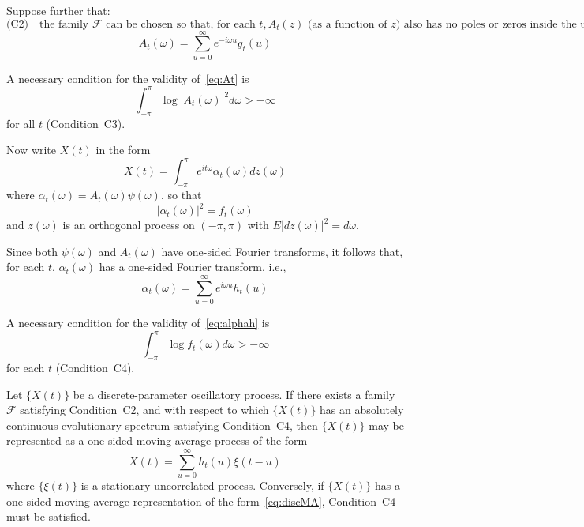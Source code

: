 \documentclass[11pt]{article}
\begin{document}
Suppose further that:
\begin{equation}
\text{(C2)} \quad \text{the family } \mathscr{F} \text{ can be chosen so that, for each } t, A_t(z) \text{ (as a function of } z) \text{ also has no poles or zeros inside the unit circle, so that, for each } t, 
\end{equation}
\begin{equation}
A_t(\omega) = \sum_{u=0}^{\infty} e^{-i\omega u} g_t(u)
\label{eq:At}
\end{equation}

A necessary condition for the validity of~\eqref{eq:At} is
\begin{equation}
\int_{-\pi}^{\pi} \log |A_t(\omega)|^2 d\omega > -\infty
\label{eq:C3}
\end{equation}
for all $t$ (Condition~C3).

Now write $X(t)$ in the form
\begin{equation}
X(t) = \int_{-\pi}^{\pi} e^{it\omega} \alpha_t(\omega) dz(\omega)
\label{eq:Xtalpha}
\end{equation}
where $\alpha_t(\omega) = A_t(\omega)\psi(\omega)$, so that
\begin{equation}
|\alpha_t(\omega)|^2 = f_t(\omega)
\label{eq:alphaft}
\end{equation}
and $z(\omega)$ is an orthogonal process on $(-\pi, \pi)$ with $E|dz(\omega)|^2 = d\omega$.

Since both $\psi(\omega)$ and $A_t(\omega)$ have one-sided Fourier transforms, it follows that, for each $t$, $\alpha_t(\omega)$ has a one-sided Fourier transform, i.e.,
\begin{equation}
\alpha_t(\omega) = \sum_{u=0}^{\infty} e^{i\omega u} h_t(u)
\label{eq:alphah}
\end{equation}

A necessary condition for the validity of~\eqref{eq:alphah} is
\begin{equation}
\int_{-\pi}^{\pi} \log f_t(\omega) d\omega > -\infty
\label{eq:C4}
\end{equation}
for each $t$ (Condition~C4).

\begin{theorem}\label{thm:discMA}
Let $\{X(t)\}$ be a discrete-parameter oscillatory process. If there exists a family $\mathscr{F}$ satisfying Condition~C2, and with respect to which $\{X(t)\}$ has an absolutely continuous evolutionary spectrum satisfying Condition~C4, then $\{X(t)\}$ may be represented as a one-sided moving average process of the form
\begin{equation}
X(t) = \sum_{u=0}^{\infty} h_t(u) \xi(t-u)
\label{eq:discMA}
\end{equation}
where $\{\xi(t)\}$ is a stationary uncorrelated process.
Conversely, if $\{X(t)\}$ has a one-sided moving average representation of the form~\eqref{eq:discMA}, Condition~C4 must be satisfied.
\end{theorem}
\end{document}
